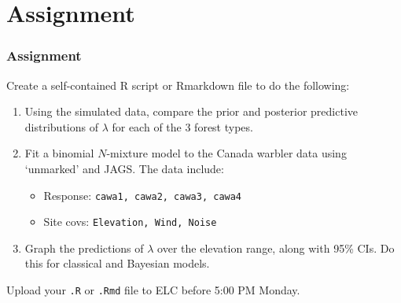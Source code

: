 \documentclass[color=usenames,dvipsnames]{beamer}\usepackage[]{graphicx}\usepackage[]{color}
\newcommand{\inr}[1]{\colorbox{inlinecolor}{\texttt{#1}}}
\begin{document}
\section{Assignment}




\begin{frame}[fragile]
  \frametitle{Assignment}
  \footnotesize
  Create a self-contained R script or Rmarkdown file
  to do the following:
  \vfill
  \begin{enumerate}
    \footnotesize
    \item Using the simulated data, compare the prior and posterior
      predictive distributions of $\lambda$ for each of the 3 forest
      types. 
    \item Fit a binomial $N$-mixture model to the Canada warbler data
      using `unmarked' and JAGS. The data include: 
      \begin{itemize}
        \footnotesize
        \item Response: \texttt{cawa1, cawa2, cawa3, cawa4}
        \item Site covs: \texttt{Elevation, Wind, Noise}
      \end{itemize}
    \item Graph the predictions of $\lambda$ over the 
      elevation range, along with 95\% CIs. Do this for classical and
      Bayesian models.  
  \end{enumerate}
  \vfill
  Upload your {\tt .R} or {\tt .Rmd} file to ELC before 5:00 PM Monday. 
\end{frame}
\end{document}
